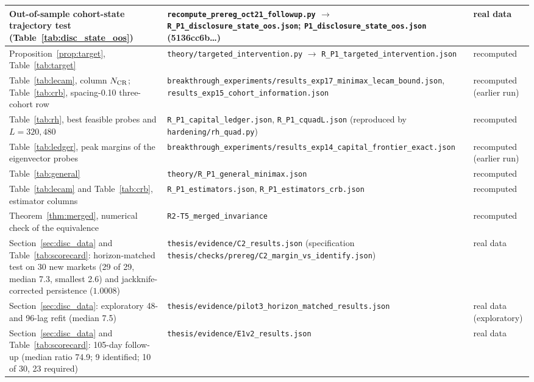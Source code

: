 \begin{longtable}{p{}p{}p{}}
Out-of-sample cohort-state trajectory test (Table~\ref{tab:disc_state_oos}) & \texttt{recompute\_\allowbreak prereg\_\allowbreak oct21\_\allowbreak followup.py} $\to$ \texttt{R\_P1\_\allowbreak disclosure\_\allowbreak state\_\allowbreak oos.json}; \texttt{P1\_\allowbreak disclosure\_\allowbreak state\_\allowbreak oos.json} (5136cc6b\ldots) & real data\\
\bottomrule
Proposition~\ref{prop:target}, Table~\ref{tab:target} & \nolinkurl{theory/targeted_intervention.py} $\to$ \nolinkurl{R_P1_targeted_intervention.json} & recomputed\\
Table~\ref{tab:lecam}, column $N_{\rm CR}$; Table~\ref{tab:crb}, spacing-0.10 three-cohort row & \nolinkurl{breakthrough_experiments/results_exp17_minimax_lecam_bound.json}, \nolinkurl{results_exp15_cohort_information.json} & recomputed (earlier run)\\
Table~\ref{tab:rh}, best feasible probes and $L=320,480$ & \nolinkurl{R_P1_capital_ledger.json}, \nolinkurl{R_P1_cquadL.json} (reproduced by \nolinkurl{hardening/rh_quad.py}) & recomputed\\
Table~\ref{tab:ledger}, peak margins of the eigenvector probes & \nolinkurl{breakthrough_experiments/results_exp14_capital_frontier_exact.json} & recomputed (earlier run)\\
Table~\ref{tab:general} & \nolinkurl{theory/R_P1_general_minimax.json} & recomputed\\
Table~\ref{tab:lecam} and Table~\ref{tab:crb}, estimator columns & \nolinkurl{R_P1_estimators.json}, \nolinkurl{R_P1_estimators_crb.json} & recomputed\\
Theorem~\ref{thm:merged}, numerical check of the equivalence & \nolinkurl{R2-T5_merged_invariance} & recomputed\\
Section~\ref{sec:disc_data} and Table~\ref{tab:scorecard}: horizon-matched test on 30 new markets (29 of 29, median 7.3, smallest 2.6) and jackknife-corrected persistence ($1.0008$) & \nolinkurl{thesis/evidence/C2_results.json} (specification \nolinkurl{thesis/checks/prereg/C2_margin_vs_identify.json}) & real data\\
Section~\ref{sec:disc_data}: exploratory 48- and 96-lag refit (median 7.5) & \nolinkurl{thesis/evidence/pilot3_horizon_matched_results.json} & real data (exploratory)\\
Section~\ref{sec:disc_data} and Table~\ref{tab:scorecard}: 105-day follow-up (median ratio 74.9; 9 identified; 10 of 30, 23 required) & \nolinkurl{thesis/evidence/E1v2_results.json} & real data\\

\end{longtable}
